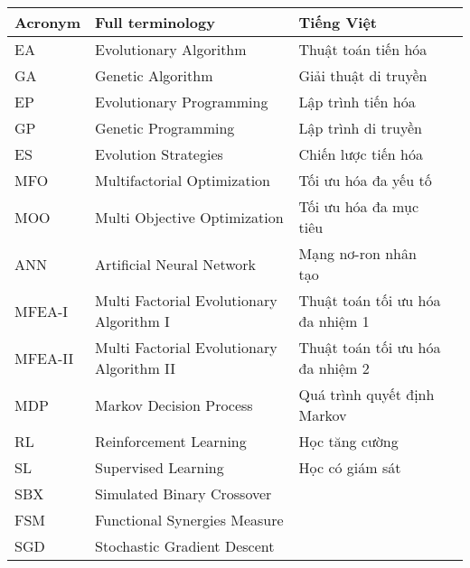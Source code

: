 \fontsize{12}{16}\selectfont

\begin{center}
\begin{tabular}{|l|l|l|l|}

\hline
\textbf{Acronym} & \textbf{Full terminology} & \textbf{Tiếng Việt} \\ \hline
    EA & Evolutionary Algorithm & Thuật toán tiến hóa\\ \hline
    GA & Genetic Algorithm & Giải thuật di truyền\\ \hline
    EP & Evolutionary Programming & Lập trình tiến hóa \\ \hline
    GP & Genetic Programming & Lập trình di truyền\\ \hline
    ES & Evolution Strategies & Chiến lược tiến hóa\\ \hline
    
    MFO & Multifactorial Optimization & Tối ưu hóa đa yếu tố  \\ \hline
    MOO & Multi Objective Optimization & Tối ưu hóa đa mục tiêu\\ \hline
     
    ANN & Artificial Neural Network & Mạng nơ-ron nhân tạo\\ \hline
    MFEA-I & Multi Factorial Evolutionary Algorithm I  & Thuật toán tối ưu hóa đa nhiệm 1\\ \hline
    MFEA-II & Multi Factorial Evolutionary Algorithm II & Thuật toán tối ưu hóa đa nhiệm 2\\ \hline
    MDP & Markov Decision Process & Quá trình quyết định Markov\\ \hline
     
    RL & Reinforcement Learning & Học tăng cường\\ \hline
    SL & Supervised Learning & Học có giám sát\\ \hline
     
    SBX & Simulated Binary Crossover & \\ \hline
     
    FSM & Functional Synergies Measure &  \\ \hline
    SGD & Stochastic Gradient Descent &\\ \hline
\end{tabular}    
\end{center}
\pagebreak